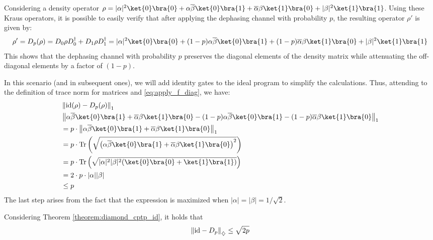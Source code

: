      Considering a density operator $\rho=|\alpha|^{2} \ket{0} \bra{0} + \alpha \overline{\beta} \ket{0} \bra{1}+ \overline{\alpha} \beta \ket{1} \bra{0} + |\beta|^{2} \ket{1} \bra{1}$. Using these Kraus operators, it is possible to easily verify  that after applying the dephasing channel with probability $p$, the resulting operator $\rho'$ is given by: 
     \begin{equation*} 
          \rho' = D_p(\rho)= D_{0} \rho D_{0}^{\dag} + D_{1} \rho D_{1}^{\dag} = |\alpha|^{2} \ket{0} \bra{0} +  (1-p) \alpha \overline{\beta} \ket{0} \bra{1}+  (1-p) \overline{\alpha}  \beta \ket{1} \bra{0} + |\beta|^{2} \ket{1} \bra{1}
     \end{equation*}
     This shows that the dephasing channel with probability $p$ preserves the diagonal elements of the density matrix while attenuating the off-diagonal elements by a factor of $(1-p)$.

     In this scenario (and in subsequent ones), we will add identity gates to the ideal program to simplify the calculations. Thus, attending to the definition of trace norm for matrices and \autoref{eq:apply_f_diag}, we have:
     \begin{align*}
      & \tracenorm{ \id(\rho) - D_{p}(\rho)} \\
      & \tracenorm{ \alpha \overline{\beta} \ket{0} \bra{1}+ \overline{\alpha} \beta \ket{1} \bra{0}  -   (1-p) \alpha \overline{\beta} \ket{0} \bra{1}-  (1-p) \overline{\alpha}  \beta \ket{1} \bra{0} } \\
      & = p \cdot  \tracenorm{ \alpha \overline{\beta} \ket{0} \bra{1} + \overline{\alpha}  \beta \ket{1} \bra{0} } \\
      & = p \cdot \tr \left(\sqrt{\left( \alpha \overline{\beta} \ket{0} \bra{1} + \overline{\alpha}  \beta \ket{1} \bra{0} \right)^2} \right) \\
      & = p \cdot  \tr \left(\sqrt{|\alpha|^{2}|\beta|^{2} (\ket{0} \bra{0}+ \ket{1} \bra{1})  } \right) \\
      & = 2 \cdot p \cdot |\alpha||\beta| \\
      & \leq p \\
     \end{align*}
     The last step arises from the fact that the expression is maximized when $|\alpha|=|\beta|=1/\sqrt{2}$.

     Considering Theorem \ref{theorem:diamond_cptp_id}, it holds that
     \begin{align*}
        \left\lVert  \mathrm{id} - D_p \right\rVert_{\diamondsuit} \leq \sqrt{2p}
     \end{align*}


